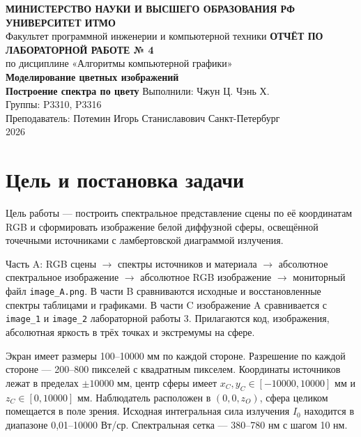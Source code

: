 \documentclass[a4paper,12pt]{article}
\newcommand{\code}[1]{\nolinkurl{#1}}
\begin{document}
\begin{titlepage}\thispagestyle{empty}
\begin{center}
\textbf{МИНИСТЕРСТВО НАУКИ И ВЫСШЕГО ОБРАЗОВАНИЯ РФ}\\[0.6em]
\textbf{УНИВЕРСИТЕТ ИТМО}\\[0.6em]
Факультет программной инженерии и компьютерной техники
\vfill
{\Large\bfseries ОТЧЁТ ПО ЛАБОРАТОРНОЙ РАБОТЕ № 4}\\[1.2em]
{\large по дисциплине «Алгоритмы компьютерной графики»}\\[2em]
{\Large\bfseries Моделирование цветных изображений\\[0.35em]
Построение спектра по цвету}
\vfill
Выполнили: Чжун Ц. Чэнь Х.\\
Группы: P3310, P3316\\
Преподаватель: Потемин Игорь Станиславович
\vfill Санкт-Петербург\\2026
\end{center}\end{titlepage}
\tableofcontents\clearpage

\section{Цель и постановка задачи}
Цель работы --- построить спектральное представление сцены по её координатам RGB и сформировать изображение белой диффузной сферы, освещённой точечными источниками с ламбертовской диаграммой излучения.

Часть A: RGB сцены $\to$ спектры источников и материала $\to$ абсолютное спектральное изображение $\to$ абсолютное RGB изображение $\to$ мониторный файл \code{image_A.png}. В части B сравниваются исходные и восстановленные спектры таблицами и графиками. В части C изображение A сравнивается с \code{image_1} и \code{image_2} лабораторной работы 3. Прилагаются код, изображения, абсолютная яркость в трёх точках и экстремумы на сфере.

Экран имеет размеры 100--10000 мм по каждой стороне. Разрешение по каждой стороне --- 200--800 пикселей с квадратным пикселем. Координаты источников лежат в пределах $\pm10000$ мм, центр сферы имеет $x_C,y_C\in[-10000,10000]$ мм и $z_C\in[0,10000]$ мм. Наблюдатель расположен в $(0,0,z_O)$, сфера целиком помещается в поле зрения. Исходная интегральная сила излучения $I_0$ находится в диапазоне 0,01--10000 Вт/ср. Спектральная сетка --- 380--780 нм с шагом 10 нм.
\end{document}
